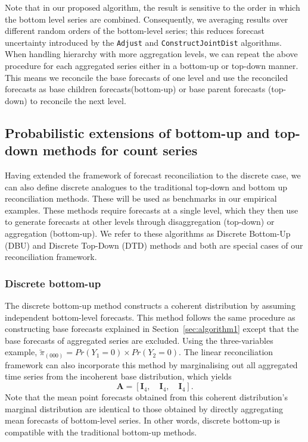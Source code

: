 \documentclass[a4paper,review,12pt,authoryear]{elsarticle}
\let\code=\texttt
\theoremstyle{definition}
\begin{document}
  Note that in our proposed algorithm, the result is sensitive to the order in which the bottom level series are combined. Consequently, we averaging results over different random orders of the bottom-level series; this reduces forecast uncertainty introduced by the \code{Adjust} and \code{ConstructJointDist} algorithms.
  When handling hierarchy with more aggregation levels, we can repeat the above procedure for each aggregated series either in a bottom-up or top-down manner. This means we reconcile the base forecasts of one level and use the reconciled forecasts as base children forecasts(bottom-up) or base parent forecasts (top-down) to reconcile the next level.



    \subsection{Probabilistic extensions of bottom-up and top-down methods for count series}

    Having extended the framework of forecast reconciliation to the discrete case, we can also define discrete analogues to the traditional top-down and bottom up reconciliation methods. These will be used as benchmarks in our empirical examples. These methods require forecasts at a single level, which they then use to generate forecasts at other levels through disaggregation (top-down) or aggregation (bottom-up).
    We refer to these algorithms as Discrete Bottom-Up (DBU) and Discrete Top-Down (DTD) methods and both are special cases of our reconciliation framework. 
    
    \subsubsection*{\textbf{Discrete bottom-up}}
    \label{sec:bottomup}

    The discrete bottom-up method constructs a coherent distribution by assuming independent bottom-level forecasts.
    This method follows the same procedure as constructing base forecasts explained in Section~\ref{sec:algorithm1} except that the base forecasts of aggregated series are excluded.
    Using the three-variables example, $\tilde{\pi}_{(000)} = Pr(Y_1=0)\times Pr(Y_2=0)$.
    The linear reconciliation framework can also incorporate this method by marginalising out all aggregated time series from the incoherent base distribution, which yields \[
    \mathbf{A} = [\mathbf{I}_4, \quad \mathbf{I}_4, \quad \mathbf{I}_4 ].
    \]
    Note that the mean point forecasts obtained from this coherent distribution's marginal distribution are identical to those obtained by directly aggregating mean forecasts of bottom-level series.
    In other words, discrete bottom-up is compatible with the traditional bottom-up methods.
\end{document}
